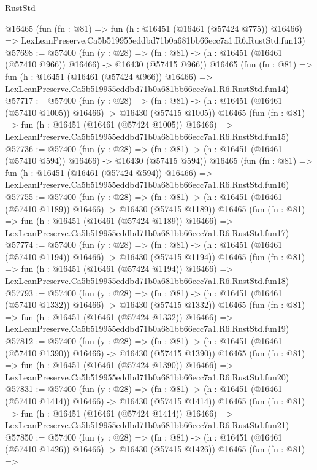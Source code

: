 \begin{lexlean}{RustStd}
\begin{coremodule}
    @16465
    (fun (fn : @81) =>
    fun (h : @16451 (@16461 (@57424 @775)) @16466) =>
    LexLeanPreserve.Ca5b519955eddbd71b0a681bb66ecc7a1.R6.RustStd.fun13)
@57698 := @57400
    (fun (y : @28) =>
    (fn : @81) -> (h : @16451 (@16461 (@57410 @966)) @16466) -> @16430 (@57415 @966))
    @16465
    (fun (fn : @81) =>
    fun (h : @16451 (@16461 (@57424 @966)) @16466) =>
    LexLeanPreserve.Ca5b519955eddbd71b0a681bb66ecc7a1.R6.RustStd.fun14)
@57717 := @57400
    (fun (y : @28) =>
    (fn : @81) -> (h : @16451 (@16461 (@57410 @1005)) @16466) -> @16430 (@57415 @1005))
    @16465
    (fun (fn : @81) =>
    fun (h : @16451 (@16461 (@57424 @1005)) @16466) =>
    LexLeanPreserve.Ca5b519955eddbd71b0a681bb66ecc7a1.R6.RustStd.fun15)
@57736 := @57400
    (fun (y : @28) =>
    (fn : @81) -> (h : @16451 (@16461 (@57410 @594)) @16466) -> @16430 (@57415 @594))
    @16465
    (fun (fn : @81) =>
    fun (h : @16451 (@16461 (@57424 @594)) @16466) =>
    LexLeanPreserve.Ca5b519955eddbd71b0a681bb66ecc7a1.R6.RustStd.fun16)
@57755 := @57400
    (fun (y : @28) =>
    (fn : @81) -> (h : @16451 (@16461 (@57410 @1189)) @16466) -> @16430 (@57415 @1189))
    @16465
    (fun (fn : @81) =>
    fun (h : @16451 (@16461 (@57424 @1189)) @16466) =>
    LexLeanPreserve.Ca5b519955eddbd71b0a681bb66ecc7a1.R6.RustStd.fun17)
@57774 := @57400
    (fun (y : @28) =>
    (fn : @81) -> (h : @16451 (@16461 (@57410 @1194)) @16466) -> @16430 (@57415 @1194))
    @16465
    (fun (fn : @81) =>
    fun (h : @16451 (@16461 (@57424 @1194)) @16466) =>
    LexLeanPreserve.Ca5b519955eddbd71b0a681bb66ecc7a1.R6.RustStd.fun18)
@57793 := @57400
    (fun (y : @28) =>
    (fn : @81) -> (h : @16451 (@16461 (@57410 @1332)) @16466) -> @16430 (@57415 @1332))
    @16465
    (fun (fn : @81) =>
    fun (h : @16451 (@16461 (@57424 @1332)) @16466) =>
    LexLeanPreserve.Ca5b519955eddbd71b0a681bb66ecc7a1.R6.RustStd.fun19)
@57812 := @57400
    (fun (y : @28) =>
    (fn : @81) -> (h : @16451 (@16461 (@57410 @1390)) @16466) -> @16430 (@57415 @1390))
    @16465
    (fun (fn : @81) =>
    fun (h : @16451 (@16461 (@57424 @1390)) @16466) =>
    LexLeanPreserve.Ca5b519955eddbd71b0a681bb66ecc7a1.R6.RustStd.fun20)
@57831 := @57400
    (fun (y : @28) =>
    (fn : @81) -> (h : @16451 (@16461 (@57410 @1414)) @16466) -> @16430 (@57415 @1414))
    @16465
    (fun (fn : @81) =>
    fun (h : @16451 (@16461 (@57424 @1414)) @16466) =>
    LexLeanPreserve.Ca5b519955eddbd71b0a681bb66ecc7a1.R6.RustStd.fun21)
@57850 := @57400
    (fun (y : @28) =>
    (fn : @81) -> (h : @16451 (@16461 (@57410 @1426)) @16466) -> @16430 (@57415 @1426))
    @16465
    (fun (fn : @81) =>

\end{coremodule}
\end{lexlean}
